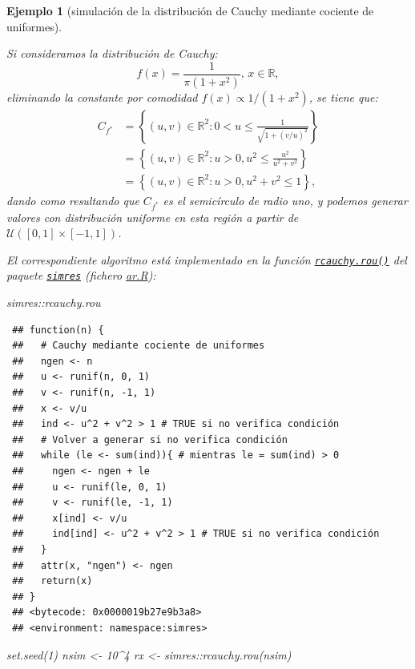 \documentclass[
  10pt,
]{book}
\newenvironment{Shaded}{\begin{snugshade}}{\end{snugshade}}
\newcommand{\DecValTok}[1]{\textcolor[rgb]{0.00,0.00,0.81}{#1}}
\newcommand{\FunctionTok}[1]{\textcolor[rgb]{0.00,0.00,0.00}{#1}}
\newcommand{\NormalTok}[1]{#1}
\newcommand{\OtherTok}[1]{\textcolor[rgb]{0.56,0.35,0.01}{#1}}
\newcommand{\SpecialCharTok}[1]{\textcolor[rgb]{0.00,0.00,0.00}{#1}}
\theoremstyle{break}
\newtheorem{example}{Ejemplo}[chapter]
\theoremstyle{nonumberplain}
\begin{document}
\begin{example}[simulación de la distribución de Cauchy mediante cociente de uniformes]
\protect\hypertarget{exm:cauchy-rou}{}\label{exm:cauchy-rou}

Si consideramos la distribución de Cauchy:
\[f(x) = \frac{1}{\pi (1 + x^2)} \text{, } x\in \mathbb{R},\]
eliminando la constante por comodidad \(f(x) \propto 1/(1 + x^2)\), se tiene que:
\[\begin{aligned}
C_{f^{\ast}} & = \left\{ (u, v) \in \mathbb{R}^{2} : 0 <u \leq \frac{1}{\sqrt{1 + (v/u)^2}}  \right\} \\
& = \left\{ (u, v) \in \mathbb{R}^{2} : u > 0, u^2 \leq \frac{u^2}{u^2 + v^2}  \right\} \\
& = \left\{ (u, v) \in \mathbb{R}^{2} : u > 0, u^2 + v^2 \leq 1  \right\}, 
\end{aligned}\]
dando como resultando que \(C_{f^{\ast}}\) es el semicírculo de radio uno, y podemos generar valores con distribución uniforme en esta región a partir de \(\mathcal{U}\left([0,1]\times[-1,1] \right)\).

El correspondiente algoritmo está implementado en la función \href{https://rubenfcasal.github.io/simres/reference/rcauchy.rou.html}{\texttt{rcauchy.rou()}} del paquete \href{https://rubenfcasal.github.io/simres}{\texttt{simres}} (fichero \href{R/ar.R}{\emph{ar.R}}):

\begin{Shaded}
\begin{Highlighting}[]
\NormalTok{simres}\SpecialCharTok{::}\NormalTok{rcauchy.rou}
\end{Highlighting}
\end{Shaded}

\begin{verbatim}
 ## function(n) {
 ##   # Cauchy mediante cociente de uniformes
 ##   ngen <- n
 ##   u <- runif(n, 0, 1)
 ##   v <- runif(n, -1, 1)
 ##   x <- v/u
 ##   ind <- u^2 + v^2 > 1 # TRUE si no verifica condición
 ##   # Volver a generar si no verifica condición
 ##   while (le <- sum(ind)){ # mientras le = sum(ind) > 0
 ##     ngen <- ngen + le
 ##     u <- runif(le, 0, 1)
 ##     v <- runif(le, -1, 1)
 ##     x[ind] <- v/u
 ##     ind[ind] <- u^2 + v^2 > 1 # TRUE si no verifica condición
 ##   }
 ##   attr(x, "ngen") <- ngen
 ##   return(x)
 ## }
 ## <bytecode: 0x0000019b27e9b3a8>
 ## <environment: namespace:simres>
\end{verbatim}

\begin{Shaded}
\begin{Highlighting}[]
\FunctionTok{set.seed}\NormalTok{(}\DecValTok{1}\NormalTok{)}
\NormalTok{nsim }\OtherTok{\textless{}{-}} \DecValTok{10}\SpecialCharTok{\^{}}\DecValTok{4}
\NormalTok{rx }\OtherTok{\textless{}{-}}\NormalTok{ simres}\SpecialCharTok{::}\FunctionTok{rcauchy.rou}\NormalTok{(nsim)}


\end{Highlighting}
\end{Shaded}
\end{example}
\end{document}
